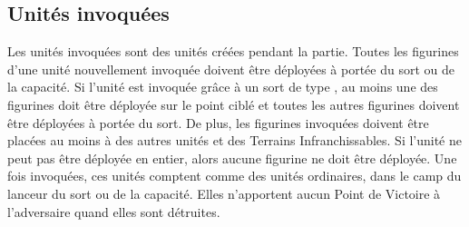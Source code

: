 \hypertarget{summonedunits}{\subsection{Unités invoquées}}
\label{summonedunits}

Les unités invoquées sont des unités créées pendant la partie. Toutes les figurines d'une unité nouvellement invoquée doivent être déployées à portée du sort ou de la capacité. Si l'unité est invoquée grâce à un sort de type \ground{}, au moins une des figurines doit être déployée sur le point ciblé et toutes les autres figurines doivent être déployées à portée du sort. De plus, les figurines invoquées doivent être placées au moins à  des autres unités et des Terrains Infranchissables. Si l'unité ne peut pas être déployée en entier, alors aucune figurine ne doit être déployée. Une fois invoquées, ces unités comptent comme des unités ordinaires, dans le camp du lanceur du sort ou de la capacité. Elles n'apportent aucun Point de Victoire à l'adversaire quand elles sont détruites.
